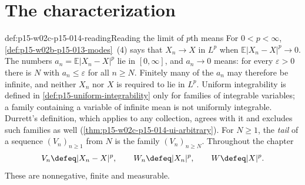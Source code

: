 \section{The characterization}
\label{sec:p15-w02c-p15-014-characterization}

\begin{hbconvention}{def:p15-w02c-p15-014-reading}{Reading the limit of \(p\)th means}
For \(0<p<\infty\), \cref{def:p15-w02b-p15-013-modes}~(4) says that
\(X_n\to X\) in \(L^p\) when \(\mathbb E|X_n-X|^p\to0\). The numbers
\(a_n=\mathbb E|X_n-X|^p\) lie in \([0,\infty]\), and \(a_n\to0\)
means: for every \(\varepsilon>0\) there is \(N\) with
\(a_n\leq\varepsilon\) for all \(n\geq N\). Finitely many of the
\(a_n\) may therefore be infinite, and neither \(X_n\) nor \(X\) is
required to lie in \(L^p\). Uniform integrability is defined in
\cref{def:p15-uniform-integrability} only for families of integrable
variables; a family containing a variable of infinite mean is not
uniformly integrable. Durrett's definition, which applies to any
collection, agrees with it and excludes such families as well
(\cref{thm:p15-w02c-p15-014-ui-arbitrary}). For \(N\geq1\), the \emph{tail} of a sequence
\((V_n)_{n\geq1}\) from \(N\) is the family \((V_n)_{n\geq N}\).
Throughout the chapter
\[
 V_n\defeq|X_n-X|^p,\qquad W_n\defeq|X_n|^p,\qquad W\defeq|X|^p .
\]
These are nonnegative, finite and measurable.
\end{hbconvention}

